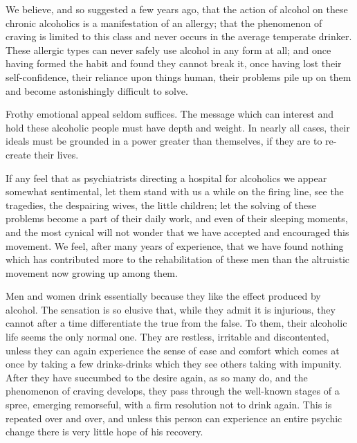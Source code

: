 \begin{biblechapter}
    We believe, and so suggested a few years ago, 
    that the action of alcohol on these chronic alcoholics 
    is a manifestation of an allergy; 
    that the phenomenon of craving is limited to this class 
    and never occurs in the average temperate drinker. 
\verse These allergic types can never safely use alcohol 
    in any form at all; 
    and once having formed the habit 
    and found they cannot break it, 
    once having lost their self-confidence, 
    their reliance upon things human, 
    their problems pile up on them 
    and become astonishingly difficult to solve.

\verse Frothy emotional appeal seldom suffices. 
\verse The message which can interest and hold these alcoholic people 
    must have depth and weight. 
\verse In nearly all cases, 
    their ideals must be grounded in a power greater than themselves, 
    if they are to re-create their lives.

\verse If any feel that as psychiatrists directing a hospital for alcoholics
    we appear somewhat sentimental, 
    let them stand with us a while on the firing line, 
    see the tragedies, the despairing wives, the little children; 
    let the solving of these problems become a part of their daily work, 
    and even of their sleeping moments, 
    and the most cynical will not wonder 
    that we have accepted and encouraged this movement. 
\verse We feel, after many years of experience, 
    that we have found nothing which has contributed 
    more to the rehabilitation of these men 
    than the altruistic movement now growing up among them.

\verse Men and women drink essentially because 
    they like the effect produced by alcohol. 
\verse The sensation is so elusive that, 
    while they admit it is injurious, 
    they cannot after a time differentiate the true from the false. 
\verse To them, their alcoholic life seems the only normal one. 
\verse They are restless, irritable and discontented, 
    unless they can again experience the sense of ease and comfort 
    which comes at once by taking a few drinks-drinks 
    which they see others taking with impunity. 
\verse After they have succumbed to the desire again, as so many do, 
    and the phenomenon of craving develops, 
    they pass through the well-known stages of a spree, 
    emerging remorseful, with a firm resolution not to drink again. 
\verse This is repeated over and over, 
    and unless this person can experience an entire psychic change 
    there is very little hope of his recovery.


\end{biblechapter}
